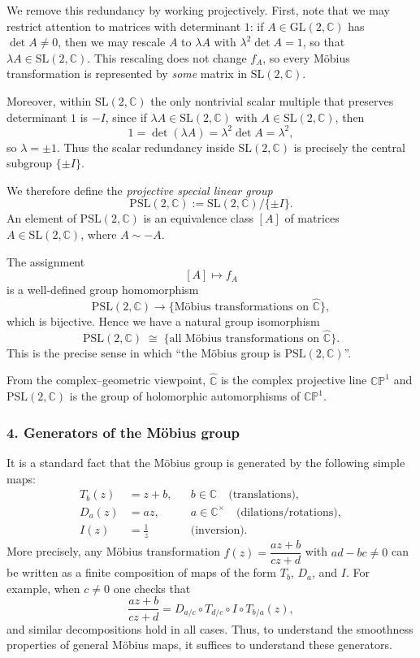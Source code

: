 \documentclass[12pt,a4paper]{article}
\theoremstyle{plain}
\theoremstyle{definition}      %
\begin{document}
	We remove this redundancy by working projectively.  First, note that we may
	restrict attention to matrices with determinant $1$:
	if $A\in\mathrm{GL}(2,\mathbb{C})$ has $\det A\neq 0$, then we may rescale
	$A$ to $\lambda A$ with $\lambda^2\det A = 1$, so that $\lambda A\in
	\mathrm{SL}(2,\mathbb{C})$.  This rescaling does not change $f_A$, so every
	Möbius transformation is represented by \emph{some} matrix in
	$\mathrm{SL}(2,\mathbb{C})$.
	
	Moreover, within $\mathrm{SL}(2,\mathbb{C})$ the only nontrivial scalar
	multiple that preserves determinant $1$ is $-I$, since if
	$\lambda A\in\mathrm{SL}(2,\mathbb{C})$ with $A\in\mathrm{SL}(2,\mathbb{C})$,
	then
	\[
	1 = \det(\lambda A) = \lambda^{2}\det A = \lambda^2,
	\]
	so $\lambda = \pm 1$.  Thus the scalar redundancy inside
	$\mathrm{SL}(2,\mathbb{C})$ is precisely the central subgroup
	$\{\pm I\}$.
	
	We therefore define the \emph{projective special linear group}
	\[
	\mathrm{PSL}(2,\mathbb{C})
	:= \mathrm{SL}(2,\mathbb{C}) / \{\pm I\}.
	\]
	An element of $\mathrm{PSL}(2,\mathbb{C})$ is an equivalence class $[A]$ of
	matrices $A\in\mathrm{SL}(2,\mathbb{C})$, where $A\sim -A$.
	
	The assignment
	\[
	[A] \longmapsto f_A
	\]
	is a well-defined group homomorphism
	\[
	\mathrm{PSL}(2,\mathbb{C})
	\longrightarrow
	\{\text{Möbius transformations on }\widehat{\mathbb{C}}\},
	\]
	which is bijective.  Hence we have a natural group isomorphism
	\[
	\mathrm{PSL}(2,\mathbb{C})
	\;\cong\;
	\{\text{all Möbius transformations on }\widehat{\mathbb{C}}\}.
	\]
	This is the precise sense in which ``the Möbius group is
	$\mathrm{PSL}(2,\mathbb{C})$''.
	
	From the complex--geometric viewpoint, $\widehat{\mathbb{C}}$ is the complex
	projective line $\mathbb{CP}^{1}$ and $\mathrm{PSL}(2,\mathbb{C})$ is the
	group of holomorphic automorphisms of $\mathbb{CP}^{1}$.
	
	\subsubsection*{4. Generators of the Möbius group}
	
	It is a standard fact that the Möbius group is generated by the following
	simple maps:
	\begin{align*}
		T_b(z) &= z + b, && b\in\mathbb{C} \quad\text{(translations)},\\
		D_a(z) &= a z,   && a\in\mathbb{C}^{\times}\quad\text{(dilations/rotations)},\\
		I(z)   &= \frac{1}{z}                     &&\text{(inversion)}.
	\end{align*}
	More precisely, any Möbius transformation $f(z)=\dfrac{az+b}{cz+d}$ with
	$ad-bc\neq 0$ can be written as a finite composition of maps of the form
	$T_b$, $D_a$, and $I$.  For example, when $c\neq 0$ one checks that
	\[
	\frac{az+b}{cz+d} =
	D_{a/c}\circ T_{d/c}\circ I\circ T_{b/a}(z),
	\]
	and similar decompositions hold in all cases.  Thus, to understand the
	smoothness properties of general Möbius maps, it suffices to understand
	these generators.
	
\end{document}
